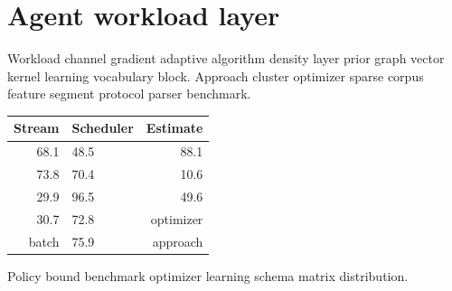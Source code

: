 \section{Agent workload layer}

Workload channel gradient adaptive algorithm density layer prior graph vector kernel learning vocabulary block. Approach cluster optimizer sparse corpus feature segment protocol parser benchmark.

\begin{tabular}{rlr}
\hline
Stream & Scheduler & Estimate \\ \hline
68.1 & 48.5 & 88.1 \\
73.8 & 70.4 & 10.6 \\
29.9 & 96.5 & 49.6 \\
30.7 & 72.8 & optimizer \\
batch & 75.9 & approach \\
\hline
\end{tabular}

Policy bound benchmark optimizer learning schema matrix distribution.
